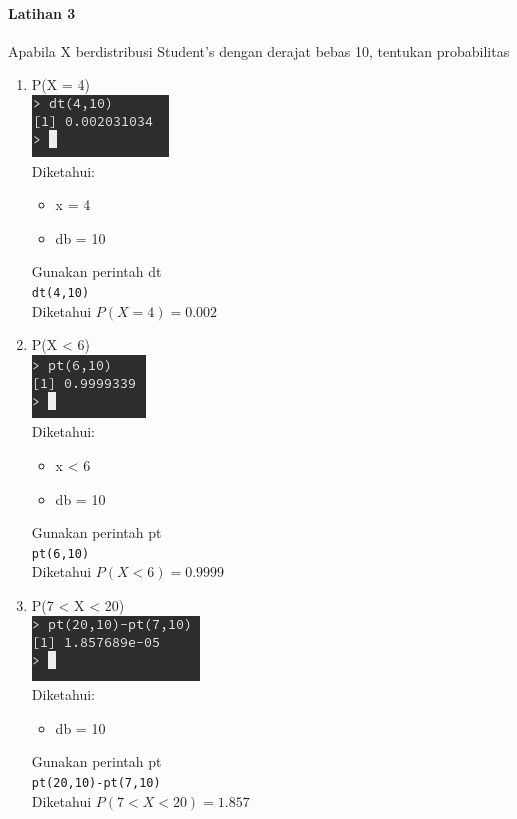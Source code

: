 \documentclass[a4paper,12pt]{article}
\begin{document}
\paragraph{Latihan 3}
Apabila X berdistribusi Student’s dengan derajat bebas 10, tentukan probabilitas\\
\begin{enumerate}[label = \alph*.]
    \item P(X = 4)\\
        \includegraphics{lat3a}\\
        Diketahui:
        \begin{itemize}
            \item x = 4
            \item db = 10
        \end{itemize}
        Gunakan perintah dt\\
        \texttt{dt(4,10)}\\
        Diketahui $P(X = 4) = 0.002$


    \item P(X < 6)\\
        \includegraphics{lat3b}\\
        Diketahui:
        \begin{itemize}
            \item x < 6
            \item db = 10
        \end{itemize}
        Gunakan perintah pt\\
        \texttt{pt(6,10)}\\
        Diketahui $P(X < 6) = 0.9999$

    \item P(7 < X < 20)\\
        \includegraphics{lat3c}\\
        Diketahui:
        \begin{itemize}
            \item db = 10
        \end{itemize}
        Gunakan perintah pt\\
        \texttt{pt(20,10)-pt(7,10)}\\
        Diketahui $P(7 < X < 20) = 1.857$


\end{enumerate}
\end{document}
